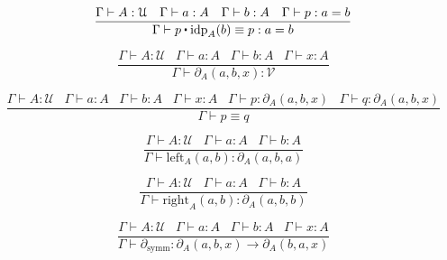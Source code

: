 \documentclass[a4paper,UKenglish,cleveref, autoref, thm-restate]{lipics-v2021}
\newcommand{\UU}{\ensuremath{\mathcal{U}}}
\newcommand{\VV}{\ensuremath{\mathcal{V}}}
\newcommand{\ct}{%
  \mathchoice{\mathbin{\raisebox{0.5ex}{$\displaystyle\centerdot$}}}%
             {\mathbin{\raisebox{0.5ex}{$\centerdot$}}}%
             {\mathbin{\raisebox{0.25ex}{$\scriptstyle\,\centerdot\,$}}}%
             {\mathbin{\raisebox{0.1ex}{$\scriptscriptstyle\,\centerdot\,$}}}
}
\begin{document}
\begin{equation*}
    \frac{\Gamma \vdash A : \UU \hspace{10pt} \Gamma \vdash a : A \hspace{10pt} \Gamma \vdash b : A \hspace{10pt} \Gamma \vdash p : a = b}{\Gamma \vdash p \ct \mathrm{idp}_A(b) \equiv p : a = b}
\end{equation*}

\begin{equation*}
    \frac{\Gamma \vdash A : \UU \hspace{10pt} \Gamma \vdash a : A \hspace{10pt} \Gamma \vdash b : A \hspace{10pt} \Gamma \vdash x : A}{\Gamma \vdash \partial_A(a, b, x) : \VV}
\end{equation*}

\begin{equation*}
    \frac{\Gamma \vdash A : \UU \hspace{10pt} \Gamma \vdash a : A \hspace{10pt} \Gamma \vdash b : A \hspace{10pt} \Gamma \vdash x : A \hspace{10pt} \Gamma \vdash p : \partial_A(a, b, x) \hspace{10pt} \Gamma \vdash q : \partial_A(a, b, x)}{\Gamma \vdash p \equiv q}
\end{equation*}

\begin{equation*}
    \frac{\Gamma \vdash A : \UU \hspace{10pt} \Gamma \vdash a : A \hspace{10pt} \Gamma \vdash b : A}{\Gamma \vdash \mathrm{left}_A(a, b) : \partial_A(a, b, a)}
\end{equation*}

\begin{equation*}
    \frac{\Gamma \vdash A : \UU \hspace{10pt} \Gamma \vdash a : A \hspace{10pt} \Gamma \vdash b : A}{\Gamma \vdash \mathrm{right}_A(a, b) : \partial_A(a, b, b)}
\end{equation*}

\begin{equation*}
    \frac{\Gamma \vdash A : \UU \hspace{10pt} \Gamma \vdash a : A \hspace{10pt} \Gamma \vdash b : A \hspace{10pt} \Gamma \vdash x : A}{\Gamma \vdash \partial_{\mathrm{symm}} : \partial_A(a, b, x) \rightarrow \partial_A(b, a, x)}
\end{equation*}
\end{document}
